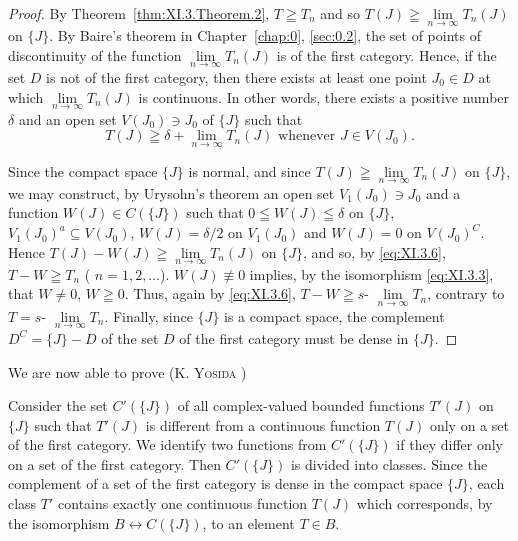 \begin{proof}
 By Theorem~\ref{thm:XI.3.Theorem.2}, $T \geqq T_n$ and so $T(J) \geqq \lim\limits_{n \to \infty} T_n(J)$ on $\{J\}$. By Baire's theorem in Chapter~\ref{chap:0}, \ref{sec:0.2}, the set of points of discontinuity of the function $\lim\limits_{n \to \infty} T_n(J)$ is of the first category. Hence, if the set $D$ is not of the first category, then there exists at least one point $J_0 \in D$ at which $\lim\limits_{n \to \infty} T_n(J)$ is continuous. In other words, there exists a positive number $\delta$ and an open set $V(J_0) \ni J_0$ of $\{J\}$ such that 
\[
T (J) \geqq \delta + \lim\limits _{n \rightarrow \infty} T _{n} (J) \text{ whenever } J \in V (J _{0}). \]

Since the compact space $\{J\}$ is normal, and since $T(J) \geqq \lim\limits_{n \to \infty} T_n(J)$ on $\{J\}$, we may construct, by Urysohn's theorem an open set $V_1(J_0) \ni J_0$ and a function $W(J) \in C(\{J\})$ such that $0 \leqq W(J) \leqq \delta$ on $\{J\}$, $V_1(J_0)^a \subseteq V(J_0)$, $W(J) = \delta/2$ on $V_1(J_0)$ and $W(J) = 0$ on $V(J_0)^C$. Hence $T(J) - W(J) \geqq \lim\limits_{n \to \infty} T_n(J)$ on $\{J\}$, and so, by \eqref{eq:XI.3.6}, $T - W \geqq T_n$ ( $n = 1, 2, \ldots$). $W(J) \not\equiv 0$ implies, by the isomorphism \eqref{eq:XI.3.3}, that $W \neq 0$, $W \geqq 0$. Thus, again by \eqref{eq:XI.3.6}, $T - W \geqq s\text{- }\lim\limits_{n \to \infty} T_n$, contrary to $T = s\text{- }\lim\limits_{n \to \infty} T_n$. Finally, since $\{J\}$ is a compact space, the complement $D^C = \{J\} - D$ of the set $D$ of the first category must be dense in $\{J\}$. 
\end{proof}

We are now able to prove (K. \textsc{Yosida} \cite{yosida355}) 


Consider the set $C'(\{J\})$ of all complex-valued bounded functions $T'(J)$ on $\{J\}$ such that $T'(J)$ is different from a continuous function $T(J)$ only on a set of the first category. We identify two functions from $C'(\{J\})$ if they differ only on a set of the first category. Then $C'(\{J\})$ is divided into classes. Since the complement of a set of the first category is dense in the compact space $\{J\}$, each class $T'$ contains exactly one continuous function $T(J)$ which corresponds, by the isomorphism $B \leftrightarrow C(\{J\})$, to an element $T \in B$. 

